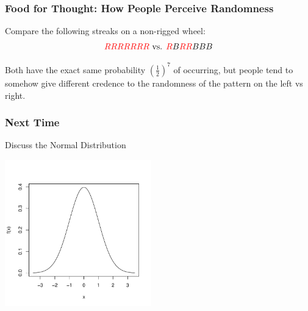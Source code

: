 \documentclass[slides]{beamer}
\newcommand{\blue}[1]{\textcolor{blue2}{#1}}
\begin{document}
\begin{frame}
\frametitle{Food for Thought: How People Perceive Randomness}
Compare the following streaks on a non-rigged wheel:
\begin{eqnarray*}
\textcolor{red}{R}\textcolor{red}{R}\textcolor{red}{R}\textcolor{red}{R}\textcolor{red}{R}\textcolor{red}{R}\textcolor{red}{R} \mbox{ vs. } \textcolor{red}{R}B\textcolor{red}{R}\textcolor{red}{R}BBB
\end{eqnarray*}

\pause Both have the exact same probability $\left(\frac{1}{2}\right)^{7}$ of occurring, but people tend to somehow give different credence to the randomness of the pattern on the left vs right.
\end{frame}


%
%
%
%


\begin{frame}[fragile]
\frametitle{Next Time}

Discuss the Normal Distribution

\begin{center}
   \includegraphics[width=2.5in]{standard_normal.pdf} 
\end{center}

\end{frame}
\end{document}
